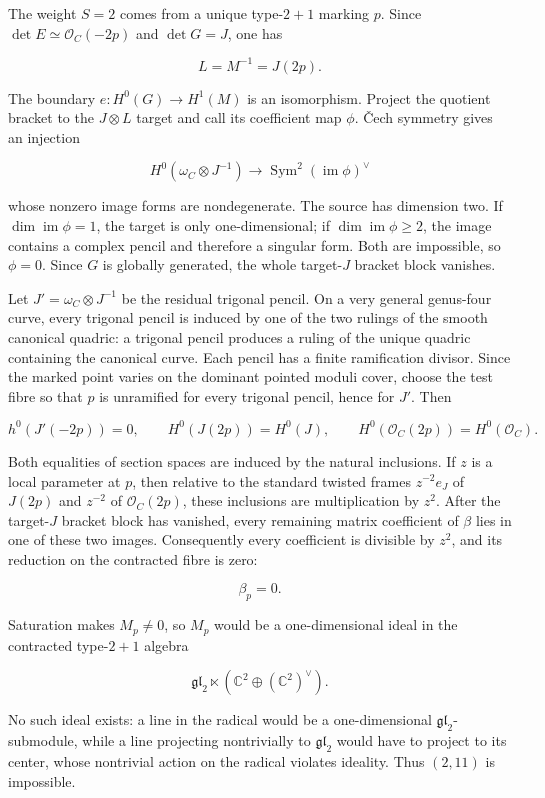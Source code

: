 \documentclass[11pt]{article}
\theoremstyle{definition}
\begin{document}
The weight \(S=2\) comes from a unique type-\(2+1\) marking \(p\). Since
\(\det E\simeq\mathcal O_C(-2p)\) and \(\det G=J\), one has

\[L=M^{-1}=J(2p).\]

The boundary \(e:H^0(G)\to H^1(M)\) is an isomorphism. Project the
quotient bracket to the \(J\otimes L\) target and call its coefficient
map \(\phi\). \v{C}ech symmetry gives an injection

\[H^0(\omega_C\otimes J^{-1})
\longrightarrow\operatorname{Sym}^2(\operatorname{im}\phi)^\vee\]

whose nonzero image forms are nondegenerate. The source has dimension
two. If \(\dim\operatorname{im}\phi=1\), the target is only
one-dimensional; if \(\dim\operatorname{im}\phi\ge2\), the image
contains a complex pencil and therefore a singular form. Both are
impossible, so \(\phi=0\). Since \(G\) is globally generated, the whole
target-\(J\) bracket block vanishes.

Let \(J'=\omega_C\otimes J^{-1}\) be the residual trigonal pencil.  On a
very general genus-four curve, every trigonal pencil is induced by one of
the two rulings of the smooth canonical quadric: a trigonal pencil produces
a ruling of the unique quadric containing the canonical curve.  Each pencil
has a finite ramification divisor.  Since the marked point varies on the
dominant pointed moduli cover, choose the test fibre so that \(p\) is
unramified for every trigonal pencil, hence for \(J'\). Then

\[h^0(J'(-2p))=0,
\qquad H^0(J(2p))=H^0(J),
\qquad H^0(\mathcal O_C(2p))=H^0(\mathcal O_C).\]

Both equalities of section spaces are induced by the natural inclusions.
If \(z\) is a local parameter at \(p\), then relative to the standard
twisted frames \(z^{-2}e_J\) of \(J(2p)\) and \(z^{-2}\) of
\(\mathcal O_C(2p)\), these inclusions are multiplication by \(z^2\).
After the target-\(J\) bracket block has vanished, every remaining matrix
coefficient of \(\beta\) lies in one of these two images.  Consequently
every coefficient is divisible by \(z^2\), and its reduction on the
contracted fibre is zero:

\[\beta_p=0.\]

Saturation makes \(M_p\ne0\), so \(M_p\) would be a one-dimensional ideal
in the contracted type-\(2+1\) algebra

\[\mathfrak{gl}_2\ltimes
(\mathbb C^2\oplus(\mathbb C^2)^\vee).\]

No such ideal exists: a line in the radical would be a one-dimensional
\(\mathfrak{gl}_2\)-submodule, while a line projecting nontrivially to
\(\mathfrak{gl}_2\) would have to project to its center, whose
nontrivial action on the radical violates ideality. Thus \((2,11)\) is
impossible.
\end{document}
